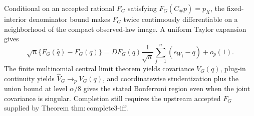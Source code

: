 Conditional on an accepted rational \(F_G\) satisfying \(F_G(C_{\#}p)=p_X\), the fixed-interior denominator bound makes \(F_G\) twice continuously differentiable on a neighborhood of the compact observed-law image. A uniform Taylor expansion gives
\[
\sqrt n\{F_G(\widehat q)-F_G(q)\}
=D F_G(q)\frac1{\sqrt n}\sum_{j=1}^{n}(e_{W_j}-q)+o_p(1).
\]
The finite multinomial central limit theorem yields covariance \(V_G(q)\), plug-in continuity yields \(\widehat V_G\to_pV_G(q)\), and coordinatewise studentization plus the union bound at level \(\alpha/8\) gives the stated Bonferroni region even when the joint covariance is singular. Completion still requires the upstream accepted \(F_G\) supplied by Theorem \(\mathrm{thm{:}complete3\text{-}iff}\).